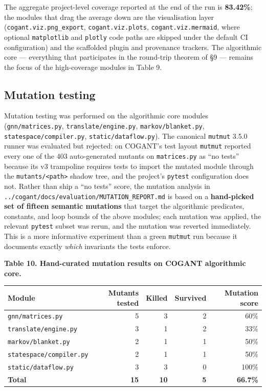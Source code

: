 \documentclass[
]{article}
\newcounter{none} %
\begin{document}
The aggregate project-level coverage reported at the end of the run is
\textbf{83.42\%}; the modules that drag the average down are the
visualisation layer (\texttt{cogant.viz.png\_export},
\texttt{cogant.viz.plots}, \texttt{cogant.viz.mermaid}, where optional
\texttt{matplotlib} and \texttt{plotly} code paths are skipped under the
default CI configuration) and the scaffolded plugin and provenance
trackers. The algorithmic core --- everything that participates in the
round-trip theorem of §9 --- remains the focus of the high-coverage
modules in Table 9.

\subsection{Mutation testing}\label{mutation-testing-1}

Mutation testing was performed on the algorithmic core modules
(\texttt{gnn/matrices.py}, \texttt{translate/engine.py},
\texttt{markov/blanket.py}, \texttt{statespace/compiler.py},
\texttt{static/dataflow.py}). The canonical \texttt{mutmut} 3.5.0 runner
was evaluated but rejected: on COGANT's test layout \texttt{mutmut}
reported every one of the 403 auto-generated mutants on
\texttt{matrices.py} as ``no tests'' because its v3 trampoline requires
tests to import the mutated module through the
\texttt{mutants/\textless{}path\textgreater{}} shadow tree, and the
project's \texttt{pytest} configuration does not. Rather than ship a
``no tests'' score, the mutation analysis in
\texttt{../cogant/docs/evaluation/MUTATION\_REPORT.md} is based on a
\textbf{hand-picked set of fifteen semantic mutations} that target the
algorithmic predicates, constants, and loop bounds of the above modules;
each mutation was applied, the relevant \texttt{pytest} subset was
rerun, and the mutation was reverted immediately. This is a more
informative experiment than a green \texttt{mutmut} run because it
documents exactly \emph{which} invariants the tests enforce.

\textbf{Table 10. Hand-curated mutation results on COGANT algorithmic
core.}

{\def\LTcaptype{none} %
\begin{longtable}[]{@{}lrrrr@{}}
\toprule\noalign{}
Module & Mutants tested & Killed & Survived & Mutation score \\
\midrule\noalign{}
\endhead
\bottomrule\noalign{}
\endlastfoot
\texttt{gnn/matrices.py} & 5 & 3 & 2 & 60\% \\
\texttt{translate/engine.py} & 3 & 1 & 2 & 33\% \\
\texttt{markov/blanket.py} & 2 & 1 & 1 & 50\% \\
\texttt{statespace/compiler.py} & 2 & 1 & 1 & 50\% \\
\texttt{static/dataflow.py} & 3 & 3 & 0 & 100\% \\
\textbf{Total} & \textbf{15} & \textbf{10} & \textbf{5} &
\textbf{66.7\%} \\
\end{longtable}
}
\end{document}
